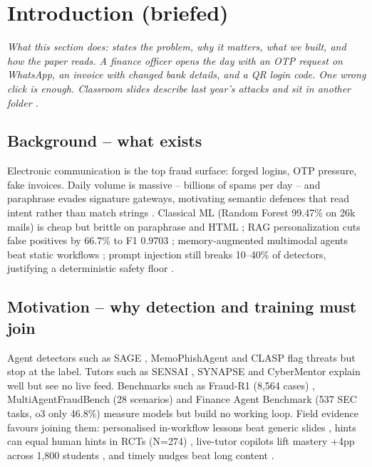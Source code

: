 \documentclass[11pt,a4paper]{article}
\begin{document}
\section{Introduction (briefed)}
\noindent\textit{What this section does: states the problem, why it matters, what we built, and how the paper reads. A finance officer opens the day with an OTP request on WhatsApp, an invoice with changed bank details, and a QR login code. One wrong click is enough. Classroom slides describe last year's attacks and sit in another folder \cite{SchoniCHI25,TrainShield25,Pardos24}.}

\subsection{Background -- what exists}
Electronic communication is the top fraud surface: forged logins, OTP pressure, fake invoices. Daily volume is massive -- billions of spams per day \cite{Nair25} -- and paraphrase evades signature gateways, motivating semantic defences that read intent rather than match strings \cite{Heiding24,HeidingIntent24,Koide24,Desolda24}. Classical ML (Random Forest 99.47\% on 26k mails) is cheap but brittle on paraphrase and HTML \cite{Algo25}; RAG personalization cuts false positives by 66.7\% to F1 0.9703 \cite{UserRAG26}; memory-augmented multimodal agents beat static workflows \cite{MemoPhish26}; prompt injection still breaks 10--40\% of detectors, justifying a deterministic safety floor \cite{Hasan25,StruQ24,Hierarchy24}.

\subsection{Motivation -- why detection and training must join}
Agent detectors such as SAGE \cite{SAGE26}, MemoPhishAgent \cite{MemoPhish26} and CLASP \cite{CLASP25} flag threats but stop at the label. Tutors such as SENSAI \cite{SENSAI25}, SYNAPSE \cite{SYNAPSE26} and CyberMentor \cite{CyberMentor25} explain well but see no live feed. Benchmarks such as Fraud-R1 (8,564 cases) \cite{FraudR125}, MultiAgentFraudBench (28 scenarios) \cite{FraudBench25} and Finance Agent Benchmark (537 SEC tasks, o3 only 46.8\%) \cite{FinAgentBench25} measure models but build no working loop. Field evidence favours joining them: personalised in-workflow lessons beat generic slides \cite{SchoniCHI25,TrainShield25,Pardos24}, hints can equal human hints in RCTs (N=274) \cite{Pardos24}, live-tutor copilots lift mastery +4pp across 1,800 students \cite{TutorCopilot24}, and timely nudges beat long content \cite{Lain24}.
\end{document}
